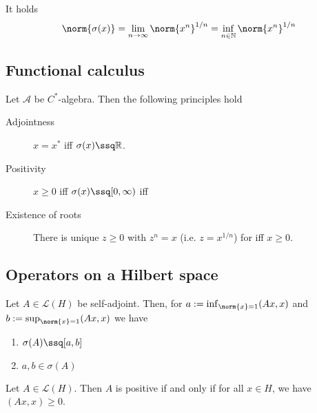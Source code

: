 \begin{thm}
    It holds
    \[\norm{\sigma(x)}  = \lim_{n\to\infty} \norm{x^n}^{1/n} = \inf_{n\in \mathbb{N}} \norm{x^n}^{1/n}\]
\end{thm}


\subsection{Functional calculus}


\begin{thm}
    Let $\mathcal{A}$ be $C^*$-algebra. Then the following principles hold
    \begin{description}
      \item[Adjointness] $x=x^*$ iff $\sigma(x)\ssq \mathbb{R}$.
      \item[Positivity] $x\geq 0 $ iff $\sigma(x)\ssq [0,\infty)$ iff 
      \item[Existence of roots] There is unique $z\geq0$ with $z^n=x$ (i.e. $z=x^{1/n}$) for iff $x\geq 0$.
    \end{description}
\end{thm}


\begin{thm}
    
\end{thm}


\subsection{Operators on a Hilbert space}


\begin{thm}
  Let $A\in \mathcal{L}(H)$ be self-adjoint. Then, for $a:=\inf_{\norm{x}=1} (Ax,x)$ and $b:=\sup_{\norm{x}=1} (Ax,x)$ we have 
  \begin{enumerate}
    \item $\sigma(A) \ssq [a,b]$ 
    \item $a,b \in \sigma(A)$
  \end{enumerate}
\end{thm}


\begin{thm}
    Let $A\in \mathcal{L}(H)$. Then $A$ is positive if and only if for all $x\in H$, we have $(Ax,x)\geq 0$.
\end{thm}



